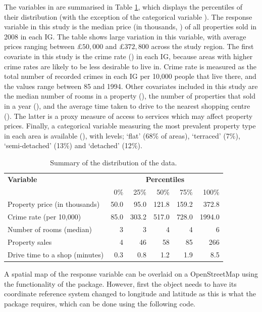 \documentclass[article,shortnames,nojss]{jss}
\begin{document}
The variables in  are summarised in Table \ref{table_scotland data}, which displays the percentiles of their distribution (with the exception of the categorical variable ). The response variable in this study is the median price (in thousands, ) of all properties sold in 2008 in each IG. The table shows large variation in this variable, with average prices ranging between $\pounds 50,000$ and $\pounds 372,800$ across the study region. The first covariate in this study is the crime rate () in each IG, because areas with higher crime rates are likely to be less desirable to live in. Crime rate is measured as the total number of recorded crimes in each IG per 10,000 people that live there, and the values range between 85 and 1994. Other covariates included in this study are the median number of rooms in a property (), the number of properties that sold in a year (), and the average time taken to drive to the nearest shopping centre (). The latter is a proxy measure of access to services which may affect property prices. Finally, a categorical variable measuring the  most prevalent property type in each area is available (), with levels; `flat' (68$\%$ of areas), `terraced' (7$\%$), `semi-detached' (13$\%$) and `detached' (12$\%$).\\ 


\begin{table}
\centering\begin{tabular}{lrrrrr}
\hline
\textbf{Variable}&\multicolumn{5}{c}{\textbf{Percentiles}}\\
&0$\%$&25$\%$&50$\%$&75$\%$&100$\%$\\\hline
Property price (in thousands)&50.0& 95.0 &121.8 &159.2 &372.8\\
Crime rate (per 10,000)&85.0&  303.2&  517.0&  728.0& 1994.0\\
Number of rooms (median)&3 &3 &4 &4 &6 \\
Property sales &4 & 46 & 58 & 85 & 266\\
Drive time to a shop (minutes)&0.3 & 0.8 & 1.2 & 1.9 & 8.5\\\hline
\end{tabular}
\caption{\label{table_scotland data} Summary of the distribution of the data.}
\end{table}

A spatial map of the  response variable can be overlaid on a OpenStreetMap using the functionality of the  package. However, first the  object needs to have its coordinate reference system changed to longitude and latitude as this is what the  package requires, which can be done using the following  code.
\end{document}
